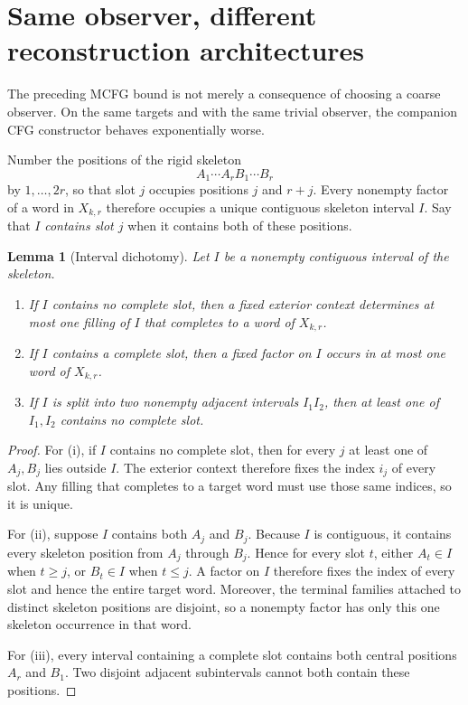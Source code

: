 \documentclass[11pt]{article}
\newtheorem{lemma}[theorem]{Lemma}
\theoremstyle{definition}
\theoremstyle{remark}
\begin{document}
\section{Same observer, different reconstruction architectures}
\label{sec:architecture}

The preceding MCFG bound is not merely a consequence of choosing a coarse
observer.  On the same targets and with the same trivial observer, the
companion CFG constructor behaves exponentially worse.

Number the positions of the rigid skeleton
\[
 A_1\cdots A_rB_1\cdots B_r
\]
by \(1,\ldots,2r\), so that slot \(j\) occupies positions \(j\) and \(r+j\).
Every nonempty factor of a word in \(X_{k,r}\) therefore occupies a unique
contiguous skeleton interval \(I\).  Say that \(I\) \emph{contains slot \(j\)}
when it contains both of these positions.

\begin{lemma}[Interval dichotomy]
\label{lem:X-interval-dichotomy}
Let \(I\) be a nonempty contiguous interval of the skeleton.
\begin{enumerate}[label=(\roman*),leftmargin=*]
\item If \(I\) contains no complete slot, then a fixed exterior context
      determines at most one filling of \(I\) that completes to a word of
      \(X_{k,r}\).
\item If \(I\) contains a complete slot, then a fixed factor on \(I\)
      occurs in at most one word of \(X_{k,r}\).
\item If \(I\) is split into two nonempty adjacent intervals \(I_1I_2\),
      then at least one of \(I_1,I_2\) contains no complete slot.
\end{enumerate}
\end{lemma}

\begin{proof}
For (i), if \(I\) contains no complete slot, then for every \(j\) at least one
of \(A_j,B_j\) lies outside \(I\).  The exterior context therefore fixes the
index \(i_j\) of every slot.  Any filling that completes to a target word must
use those same indices, so it is unique.

For (ii), suppose \(I\) contains both \(A_j\) and \(B_j\).  Because \(I\) is
contiguous, it contains every skeleton position from \(A_j\) through \(B_j\).
Hence for every slot \(t\), either \(A_t\in I\) when \(t\ge j\), or
\(B_t\in I\) when \(t\le j\).  A factor on \(I\) therefore fixes the index of
every slot and hence the entire target word.  Moreover, the terminal families
attached to distinct skeleton positions are disjoint, so a nonempty factor has
only this one skeleton occurrence in that word.

For (iii), every interval containing a complete slot contains both central
positions \(A_r\) and \(B_1\).  Two disjoint adjacent subintervals cannot both
contain these positions.
\end{proof}
\end{document}
